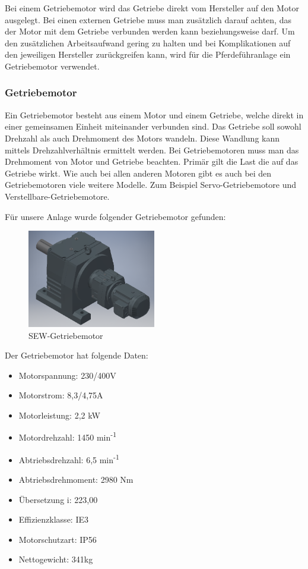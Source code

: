 \documentclass[12pt]{scrreprt} %
\begin{document}
Bei einem Getriebemotor wird das Getriebe direkt vom Hersteller auf den Motor ausgelegt. Bei einen externen Getriebe muss man zusätzlich darauf achten, das der Motor mit dem Getriebe verbunden werden kann beziehungsweise darf. Um den zusätzlichen Arbeitsaufwand gering zu halten und bei Komplikationen auf den jeweiligen Hersteller zurückgreifen kann, wird für die Pferdeführanlage ein Getriebemotor verwendet.

\subsubsection{Getriebemotor}
\label{sec:getriebemotor}

Ein Getriebemotor  besteht aus einem Motor und einem Getriebe, welche direkt in einer gemeinsamen Einheit miteinander verbunden sind. Das Getriebe soll sowohl Drehzahl als auch Drehmoment des Motors wandeln. Diese Wandlung kann mittels Drehzahlverhältnis ermittelt werden. Bei Getriebemotoren muss man das Drehmoment von Motor und Getriebe beachten. Primär gilt die Last die auf das Getriebe wirkt. 
Wie auch bei allen anderen Motoren gibt es auch bei den Getriebemotoren viele weitere Modelle. Zum Beispiel Servo-Getriebemotore und Verstellbare-Getriebemotore.

Für unsere Anlage wurde folgender Getriebemotor gefunden:

\begin{figure}[!ht]
\begin{center}
	\caption{SEW-Getriebemotor}
	\includegraphics[width=0.5\textwidth]{SEWGetriebemotor}
\end{center}
\end{figure}

Der Getriebemotor hat folgende Daten:

\begin{itemize}
	\item{Motorspannung: 230/400V}
	\item{Motorstrom: 8,3/4,75A}
	\item{Motorleistung: 2,2 kW}
	\item{Motordrehzahl: 1450 min\textsuperscript{-1}}
	\item{Abtriebsdrehzahl: 6,5 min\textsuperscript{-1}}
	\item{Abtriebsdrehmoment: 2980 Nm}
	\item{Übersetzung i: 223,00}
	\item{Effizienzklasse: IE3}
	\item{Motorschutzart: IP56}
	\item{Nettogewicht: 341kg}
\end{itemize}
\end{document}
